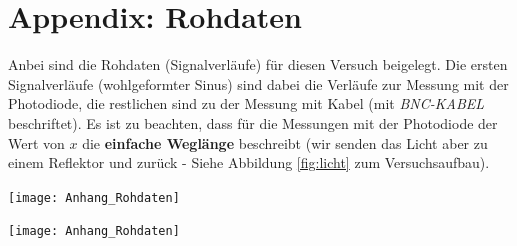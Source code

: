 \documentclass[10pt,a4paper]{article}
\begin{document}
\begingroup
\raggedright
\sloppy
\printbibliography[heading=bibintoc,title={6 \hspace{6pt} Literatur}]
\endgroup

\newpage

\section{Appendix: Rohdaten}
\begin{flushleft}
Anbei sind die Rohdaten (Signalverläufe) für diesen Versuch beigelegt. Die ersten Signalverläufe (wohlgeformter Sinus) sind dabei die Verläufe zur Messung mit der Photodiode, die restlichen sind zu der Messung mit Kabel (mit \textit{BNC-KABEL} beschriftet). Es ist zu beachten, dass für die Messungen mit der Photodiode der Wert von $x$ die \textbf{einfache Weglänge} beschreibt (wir senden das Licht aber zu einem Reflektor und zurück - Siehe Abbildung \ref{fig:licht} zum Versuchsaufbau).
\end{flushleft}

\texttt{[image: Anhang\_Rohdaten]}

\texttt{[image: Anhang\_Rohdaten]}


\end{document}
